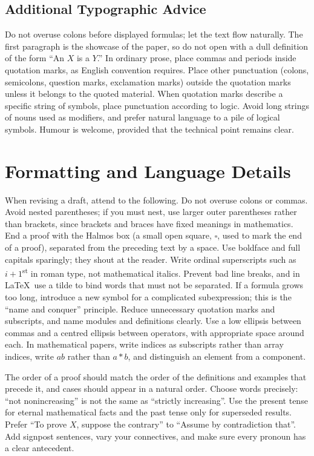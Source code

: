 \documentclass[11pt]{article}
\begin{document}
\subsection{Additional Typographic Advice}

Do not overuse colons before displayed formulas; let the text flow naturally. The first paragraph is the showcase of the paper, so do not open with a dull definition of the form ``An $X$ is a $Y$.'' In ordinary prose, place commas and periods inside quotation marks, as English convention requires. Place other punctuation (colons, semicolons, question marks, exclamation marks) outside the quotation marks unless it belongs to the quoted material. When quotation marks describe a specific string of symbols, place punctuation according to logic. Avoid long strings of nouns used as modifiers, and prefer natural language to a pile of logical symbols. Humour is welcome, provided that the technical point remains clear.

\section{Formatting and Language Details}

When revising a draft, attend to the following. Do not overuse colons or commas. Avoid nested parentheses; if you must nest, use larger outer parentheses rather than brackets, since brackets and braces have fixed meanings in mathematics. End a proof with the Halmos box (a small open square, $\square$, used to mark the end of a proof), separated from the preceding text by a space. Use boldface and full capitals sparingly; they shout at the reader. Write ordinal superscripts such as $i+1$\textsuperscript{st} in roman type, not mathematical italics. Prevent bad line breaks, and in \LaTeX\ use a tilde to bind words that must not be separated. If a formula grows too long, introduce a new symbol for a complicated subexpression; this is the ``name and conquer'' principle. Reduce unnecessary quotation marks and subscripts, and name modules and definitions clearly. Use a low ellipsis between commas and a centred ellipsis between operators, with appropriate space around each. In mathematical papers, write indices as subscripts rather than array indices, write $ab$ rather than $a*b$, and distinguish an element from a component.

The order of a proof should match the order of the definitions and examples that precede it, and cases should appear in a natural order. Choose words precisely: ``not nonincreasing'' is not the same as ``strictly increasing''. Use the present tense for eternal mathematical facts and the past tense only for superseded results. Prefer ``To prove $X$, suppose the contrary'' to ``Assume by contradiction that''. Add signpost sentences, vary your connectives, and make sure every pronoun has a clear antecedent.
\end{document}
